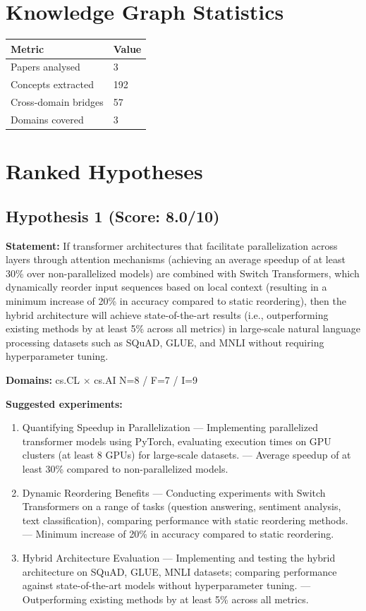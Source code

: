 \documentclass[12pt,a4paper]{article}
\begin{document}
\section{Knowledge Graph Statistics}

\begin{tabular}{ll}
\toprule
Metric & Value \\
\midrule
Papers analysed   & 3 \\
Concepts extracted & 192 \\
Cross-domain bridges & 57 \\
Domains covered   & 3 \\
\bottomrule
\end{tabular}

\section{Ranked Hypotheses}

\subsection*{Hypothesis 1 (Score: 8.0/10)}

\textbf{Statement:} If transformer architectures that facilitate parallelization across layers through attention mechanisms (achieving an average speedup of at least 30\% over non-parallelized models) are combined with Switch Transformers, which dynamically reorder input sequences based on local context (resulting in a minimum increase of 20\% in accuracy compared to static reordering), then the hybrid architecture will achieve state-of-the-art results (i.e., outperforming existing methods by at least 5\% across all metrics) in large-scale natural language processing datasets such as SQuAD, GLUE, and MNLI without requiring hyperparameter tuning.

\noindent\textbf{Domains:} cs.CL $\times$ cs.AI
\hspace{1em} N=8 / F=7 / I=9

\textbf{Suggested experiments:}
\begin{enumerate}
  \item Quantifying Speedup in Parallelization — Implementing parallelized transformer models using PyTorch, evaluating execution times on GPU clusters (at least 8 GPUs) for large-scale datasets. — Average speedup of at least 30\% compared to non-parallelized models.
  \item Dynamic Reordering Benefits — Conducting experiments with Switch Transformers on a range of tasks (question answering, sentiment analysis, text classification), comparing performance with static reordering methods. — Minimum increase of 20\% in accuracy compared to static reordering.
  \item Hybrid Architecture Evaluation — Implementing and testing the hybrid architecture on SQuAD, GLUE, MNLI datasets; comparing performance against state-of-the-art models without hyperparameter tuning. — Outperforming existing methods by at least 5\% across all metrics.
\end{enumerate}
\end{document}

